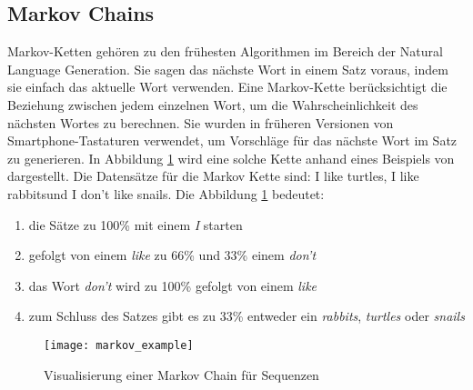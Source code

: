 \subsection{Markov Chains}
\label{sub:markov_chains}
Markov-Ketten gehören zu den frühesten Algorithmen im Bereich der Natural Language Generation. Sie sagen das nächste
Wort in einem Satz voraus, indem sie einfach das aktuelle Wort verwenden. Eine Markov-Kette berücksichtigt die Beziehung
zwischen jedem einzelnen Wort, um die Wahrscheinlichkeit des nächsten Wortes zu berechnen. Sie wurden in früheren
Versionen von Smartphone-Tastaturen verwendet, um Vorschläge für das nächste Wort im Satz zu generieren.
\newline
\newline
In Abbildung \ref{fig:markov-example} wird eine solche Kette anhand eines Beispiels von
\cite{andrew_adventure_markov_chain} dargestellt. Die Datensätze für die Markov Kette sind: \flqq I like turtles\frqq,
\flqq I like rabbits\frqq und \flqq I don't like snails\frqq. Die Abbildung \ref{fig:markov-example} bedeutet:
\begin{enumerate}
	\setlength\itemsep{0em}
	\item die Sätze zu 100\% mit einem \textit{I} starten
	\item gefolgt von einem \textit{like} zu 66\% und 33\% einem \textit{don't}
	\item das Wort \textit{don't} wird zu 100\% gefolgt von einem \textit{like}
	\item zum Schluss des Satzes gibt es zu 33\% entweder ein \textit{rabbits}, \textit{turtles} oder \textit{snails}
\end{enumerate}
\begin{figure}[H]
	\centering
	\texttt{[image: markov\_example]}
	\caption{Visualisierung einer Markov Chain für Sequenzen}
	\label{fig:markov-example}
\end{figure}

